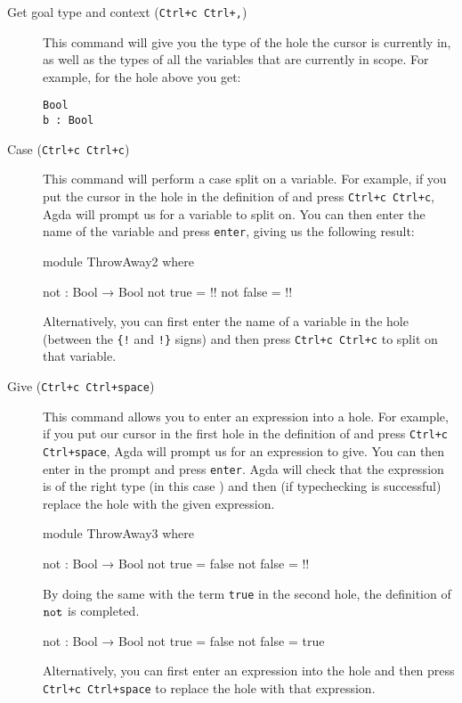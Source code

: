 \documentclass[a4paper,UKenglish]{tufte-handout}
\theoremstyle{definition}
\newcommand\var[1]{\mathit{#1}}
\newcommand\fun[1]{{\AgdaFunction{#1}}}
\newcommand\data[1]{{\AgdaFunction{#1}}}
\newcommand\con[1]{{\AgdaInductiveConstructor{#1}}}
\begin{document}
\begin{description}
\item[Get goal type and context (\texttt{Ctrl+c Ctrl+,})] This command
  will give you the type of the hole the cursor is currently in, as
  well as the types of all the variables that are currently in
  scope. For example, for the hole above you get:
\begin{verbatim}
Bool
b : Bool
\end{verbatim}
\item[Case (\texttt{Ctrl+c Ctrl+c})] This command will perform a case
  split on a variable. For example, if you put the cursor in the hole
  in the definition of \fun{not} and press \texttt{Ctrl+c Ctrl+c},
  Agda will prompt us for a variable to split on. You can then
  enter the name \var{x} of the variable and press \texttt{enter},
  giving us the following result:
\begin{code}[hide]
module ThrowAway2 where
\end{code}
\begin{code}[number]
  not : Bool → Bool
  not true   = {!!}
  not false  = {!!}
\end{code}
  Alternatively, you can first enter the name of a variable in
  the hole (between the \texttt{\{!} and \texttt{!\}} signs)
  and then press \texttt{Ctrl+c Ctrl+c} to split on that variable.
\item[Give (\texttt{Ctrl+c Ctrl+space})] This command allows
  you to enter an expression into a hole. For example, if you put 
  our cursor in the first hole in the definition of \fun{not}
  and press \texttt{Ctrl+c Ctrl+space}, Agda will prompt us
  for an expression to give. You can then enter \con{false} in
  the prompt and press \texttt{enter}. Agda will check that the
  expression is of the right type (in this case \data{Bool}) and
  then (if typechecking is successful) replace the hole with the given
  expression. 
  \begin{code}[hide]
module ThrowAway3 where
\end{code}%
\begin{code}[number]
  not  : Bool → Bool
  not  true   = false
  not  false  = {!!}
\end{code}
  By doing the same with the term \texttt{true} in the second hole,
  the definition of $\fun{not}$ is completed.
\begin{code}[hide]
not  : Bool → Bool
not  true   = false
not  false  = true
\end{code}
  Alternatively, you can first enter an expression into
  the hole and then
  press \texttt{Ctrl+c Ctrl+space} to replace the hole with that expression.


\end{description}
\end{document}
